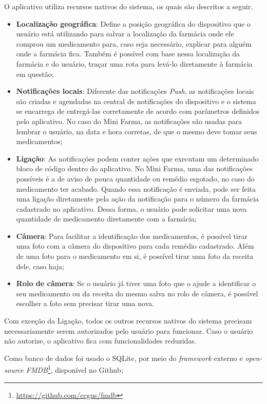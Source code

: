 O aplicativo utiliza recursos nativos do sistema, os quais são descritos a seguir. 
\begin{itemize}
	\item \textbf{Localização geográfica}: Define a posição geográfica do dispositivo que o usuário está utilizando para salvar a 
    localização da farmácia onde ele comprou um medicamento para, caso seja necessário, explicar para alguém onde a 
    farmácia fica. Também é possível com base nessa localização da farmácia e do usuário, traçar uma rota para levá-lo diretamente à 
    farmácia em questão;
	\item \textbf{Notificações locais}: Diferente das notificações \textit{Push}, as notificações locais são criadas e agendadas na central 
    de notificações do dispositivo e o sistema se encarrega de entregá-las corretamente de acordo com parâmetros definidos pelo aplicativo. 
    No caso do Mini Farma, as notificações são usadas para lembrar o usuário, na data e hora corretas, de que o mesmo deve tomar seus medicamentos;
	\item \textbf{Ligação}: As notificações podem conter ações que executam um determinado bloco de código dentro do aplicativo. No Mini Farma, 
    uma das notificações possíveis é a de aviso de pouca quantidade ou remédio esgotado, no caso do medicamento ter acabado. 
    Quando essa notificação é enviada, pode ser feita uma ligação diretamente pela ação da notificação para o número da 
    farmácia cadastrado no aplicativo. Dessa forma, o usuário pode solicitar uma nova quantidade de medicamento diretamente com a farmácia; 
	\item \textbf{Câmera}: Para facilitar a identificação dos medicamentos, é possível tirar uma foto com a câmera do dispositivo para 
    cada remédio cadastrado. Além de uma foto para o medicamento em si, é possível tirar uma foto da receita dele, caso haja;
    \item \textbf{Rolo de câmera}: Se o usuário já tiver uma foto que o ajude a identificar o seu medicamento ou da receita do mesmo salva 
    no rolo de câmera, é possível escolher a foto sem precisar tirar uma nova.
\end{itemize}

Com exceção da Ligação, todos os outros recursos nativos do sistema precisam necessariamente serem autorizados pelo
usuário para funcionar. Caso o usuário não autorize, o aplicativo fica com funcionalidades reduzidas.

Como banco de dados foi usado o SQLite, por meio do \textit{framework} externo e \textit{open-source FMDB}\footnote{\url{https://github.com/ccgus/fmdb}}, 
disponível no Github;

